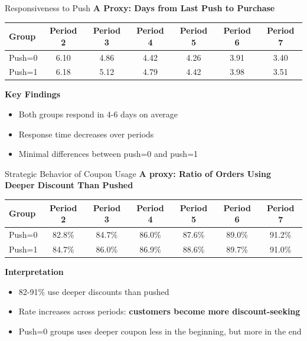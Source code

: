 \documentclass[aspectratio=169]{beamer}  %
\begin{document}
\begin{frame}{Responsiveness to Push}
\textbf{A Proxy: Days from Last Push to Purchase}

\begin{table}
\centering
\begin{tabular}{lcccccc}
\toprule
Group & Period 2 & Period 3 & Period 4 & Period 5 & Period 6 & Period 7 \\
\midrule
Push=0 & 6.10 & 4.86 & 4.42 & 4.26 & 3.91 & 3.40 \\
Push=1 & 6.18 & 5.12 & 4.79 & 4.42 & 3.98 & 3.51 \\
\bottomrule
\end{tabular}
\end{table}

\vspace{0.3cm}
\textbf{Key Findings}
\begin{itemize}
    \item Both groups respond in 4-6 days on average
    \item Response time decreases over periods
    \item Minimal differences between push=0 and push=1
\end{itemize}
\end{frame}

\begin{frame}{Strategic Behavior of Coupon Usage}
\textbf{A proxy: Ratio of Orders Using Deeper Discount Than Pushed}

\begin{table}
\centering
\begin{tabular}{lcccccc}
\toprule
Group & Period 2 & Period 3 & Period 4 & Period 5 & Period 6 & Period 7 \\
\midrule
Push=0 & 82.8\% & 84.7\% & 86.0\% & 87.6\% & 89.0\% & 91.2\% \\
Push=1 & 84.7\% & 86.0\% & 86.9\% & 88.6\% & 89.7\% & 91.0\% \\
\bottomrule
\end{tabular}
\end{table}

\vspace{0.3cm}
\textbf{Interpretation}
\begin{itemize}
    \item 82-91\% use deeper discounts than pushed
    \item Rate increases across periods: \textbf{customers become more discount-seeking}
    \item Push=0 groups uses deeper coupon less in the beginning, but more in the end
\end{itemize}
\end{frame}
\end{document}
